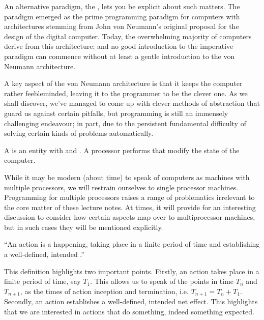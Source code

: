 An alternative paradigm, the , lets you be explicit about such
matters. The paradigm emerged as the prime programming paradigm for computers
with architectures stemming from John von Neumann's original proposal for the
design of the digital computer\cite{von-neumann}. Today, the overwhelming
majority of computers derive from this architecture; and no good introduction
to the imperative paradigm can commence without at least a gentle introduction
to the von Neumann architecture.

A key aspect of the von Neumann architecture is that it keeps the computer
rather feebleminded, leaving it to the programmer to be the clever one. As we
shall discover, we've managed to come up with clever methods of abstraction
that guard us against certain pitfalls, but programming is still an immensely
challenging endeavour; in part, due to the persistent fundamental difficulty of
solving certain kinds of problems automatically.

\begin{definition}

A \footnotemark is an entity with  and
. A processor performs  that modify the state of
the computer.


\end{definition}

While it may be modern (about time) to speak of computers as machines with
multiple processors, we will restrain ourselves to single processor machines.
Programming for multiple processors raises a range of problematics irrelevant
to the core matter of these lecture notes. At times, it will provide for an
interesting discussion to consider how certain aspects map over to
multiprocessor machines, but in such cases they will be mentioned explicitly.

\begin{definition}

``An action is a happening, taking place in a finite period of time and
establishing a well-defined, intended .''
\cite{dijkstra-introduction}

\end{definition}

This definition highlights two important points. Firstly, an action takes place
in a finite period of time, say $T_1$. This allows us to speak of the points in
time $T_n$ and $T_{n+1}$, as the times of action inception and termination,
i.e. $T_{n+1}=T_n+T_1$. Secondly, an action establishes a well-defined,
intended net effect. This highlights that we are interested in actions that do
something, indeed something expected.

